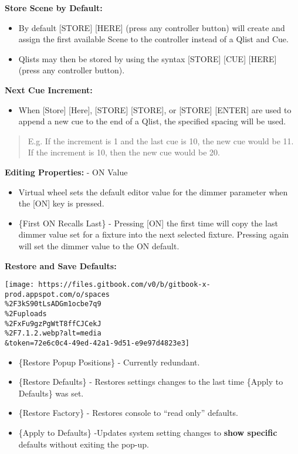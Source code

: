 \documentclass[
]{article}
\providecommand{\tightlist}{%
  \setlength{\itemsep}{0pt}\setlength{\parskip}{0pt}}
\begin{document}
\textbf{Store Scene by Default:}

\begin{itemize}
\item
  By default {[}STORE{]} {[}HERE{]} (press any controller button) will create and assign the first available Scene to the controller instead of a Qlist and Cue.
\item
  Qlists may then be stored by using the syntax {[}STORE{]} {[}CUE{]} {[}HERE{]} (press any controller button).
\end{itemize}

\textbf{Next Cue Increment:}

\begin{itemize}
\tightlist
\item
  When {[}Store{]} {[}Here{]}, {[}STORE{]} {[}STORE{]}, or {[}STORE{]} {[}ENTER{]} are used to append a new cue to the end of a Qlist, the specified spacing will be used.
\end{itemize}

\begin{quote}
E.g. If the increment is 1 and the last cue is 10, the new cue would be 11. If the increment is 10, then the new cue would be 20.
\end{quote}

\textbf{Editing Properties:} - ON Value

\begin{itemize}
\item
  Virtual wheel sets the default editor value for the dimmer parameter when the {[}ON{]} key is pressed.
\item
  {\{First ON Recalls Last\} - Pressing {[}ON{]} the first time will copy the last dimmer value set for a fixture into the next selected fixture. Pressing again will set the dimmer value to the ON default.}
\end{itemize}

\textbf{Restore and Save Defaults:}

\texttt{[image: https://files.gitbook.com/v0/b/gitbook-x-prod.appspot.com/o/spaces\\\%2F3kS90tLsADGm1ocbe7q9\\\%2Fuploads\\\%2FxFu9gzPgWtT8ffCJCekJ\\\%2F7.1.2.webp?alt=media\\\&token=72e6c0c4-49ed-42a1-9d51-e9e97d4823e3]}

\begin{itemize}
\item
  \{Restore Popup Positions\} - {Currently redundant.}
\item
  \{Restore Defaults\} - Restores settings changes to the last time \{Apply to Defaults\} was set.
\item
  \{Restore Factory\} - Restores console to ``read only'' defaults.
\item
  \{Apply to Defaults\} -Updates system setting changes to \textbf{show specific} defaults without exiting the pop-up.
\end{itemize}
\end{document}

